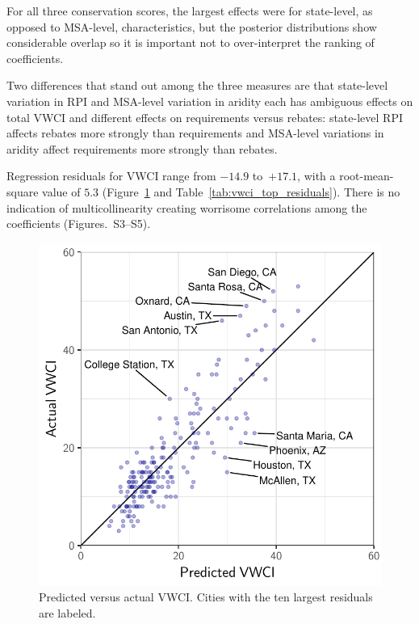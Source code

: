 \documentclass[draft,linenumbers]{agujournal}\usepackage{knitr}
\begin{document}
For all three conservation scores, the largest effects were for state-level, as opposed to MSA-level, characteristics, but the posterior distributions show considerable overlap so it is important not to over-interpret the ranking of coefficients.

Two differences that stand out among the three measures are that state-level variation in RPI and MSA-level variation in aridity each has ambiguous effects on total VWCI and different effects on requirements versus rebates: state-level RPI affects rebates more strongly than requirements and MSA-level variations in aridity affect requirements more strongly than rebates.

%
%

Regression residuals for VWCI range from $-14.9$ to~$+17.1$, with a root-mean-square value of $5.3$ (Figure~\ref{fig:vwci_residuals} and Table~\ref{tab:vwci_top_residuals}).
There is no indication of multicollinearity creating worrisome correlations among the coefficients (Figures.~S3--S5).
%
%

\begin{figure}[tb]

{\centering \includegraphics[width=0.8\linewidth]{figure/vwci_residuals-1}

}

\caption[Predicted versus actual VWCI]{Predicted versus actual VWCI. Cities with the ten largest residuals are labeled.}\label{fig:vwci_residuals}
\end{figure}
\end{document}
